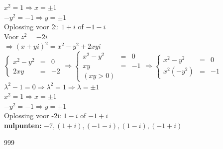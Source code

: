 \documentclass[a4paper]{article}
\begin{document}
$x^2 = 1 \Rightarrow x = \pm 1$\\

$-y^2 = -1 \Rightarrow y = \pm 1$\\

Oplossing voor 2i: $1 + i$ of $-1 - i$\\

Voor $z^2 = -2i$\\

$\Rightarrow (x + yi)^2 = x^2 - y^2 + 2xyi$\\

$\left\{
	\begin{array}{lll}
		x^2 - y^2 & = & 0\\
		2xy & = &  -2
	\end{array}
\right .
\Rightarrow
\left\{
	\begin{array}{lll}
		x^2 - y^2 & = & 0\\
		xy & = & -1\\
        (xy > 0)
	\end{array}
\right .
\Rightarrow
\left\{
	\begin{array}{lll}
		x^2 - y^2 & = & 0\\
		x^2 (-y^2) & = & -1
	\end{array}
\right .$\\

$\lambda^2 -1 = 0 \Rightarrow \lambda^2 = 1 \Rightarrow \lambda = \pm 1$\\

$x^2 = 1 \Rightarrow x = \pm 1$\\

$-y^2 = -1 \Rightarrow y = \pm 1$\\

Oplossing voor -2i: $1 - i$ of $-1 + i$\\



\textbf{nulpunten:} $-7, (1 + i), (-1 - i), (1 - i), (-1 + i)$








\begin{thebibliography}{999}
\end{thebibliography}
\end{document}
